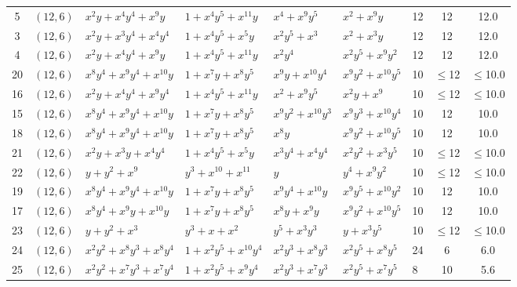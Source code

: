 \begin{table}[t]
\begin{tabular*}{\textwidth}{@{\extracolsep{\fill}}cllllllcc}
5 & $(12,6)$ & $x^{2}y{+}x^{4}y^{4}{+}x^{9}y$ & $1{+}x^{4}y^{5}{+}x^{11}y$ & $x^{4}{+}x^{9}y^{5}$ & $x^{2}{+}x^{9}y$ & 12 & 12 & 12.0 \\
3 & $(12,6)$ & $x^{2}y{+}x^{3}y^{4}{+}x^{4}y^{4}$ & $1{+}x^{4}y^{5}{+}x^{5}y$ & $x^{2}y^{5}{+}x^{3}$ & $x^{2}{+}x^{3}y$ & 12 & 12 & 12.0 \\
4 & $(12,6)$ & $x^{2}y{+}x^{4}y^{4}{+}x^{9}y$ & $1{+}x^{4}y^{5}{+}x^{11}y$ & $x^{2}y^{4}$ & $x^{2}y^{5}{+}x^{9}y^{2}$ & 12 & 12 & 12.0 \\
20 & $(12,6)$ & $x^{8}y^{4}{+}x^{9}y^{4}{+}x^{10}y$ & $1{+}x^{7}y{+}x^{8}y^{5}$ & $x^{9}y{+}x^{10}y^{4}$ & $x^{9}y^{2}{+}x^{10}y^{5}$ & 10 & $\leq$12 & $\leq$10.0 \\
16 & $(12,6)$ & $x^{2}y{+}x^{4}y^{4}{+}x^{9}y^{4}$ & $1{+}x^{4}y^{5}{+}x^{11}y$ & $x^{2}{+}x^{9}y^{5}$ & $x^{2}y{+}x^{9}$ & 10 & $\leq$12 & $\leq$10.0 \\
15 & $(12,6)$ & $x^{8}y^{4}{+}x^{9}y^{4}{+}x^{10}y$ & $1{+}x^{7}y{+}x^{8}y^{5}$ & $x^{9}y^{2}{+}x^{10}y^{3}$ & $x^{9}y^{3}{+}x^{10}y^{4}$ & 10 & 12 & 10.0 \\
18 & $(12,6)$ & $x^{8}y^{4}{+}x^{9}y^{4}{+}x^{10}y$ & $1{+}x^{7}y{+}x^{8}y^{5}$ & $x^{8}y$ & $x^{9}y^{2}{+}x^{10}y^{5}$ & 10 & 12 & 10.0 \\
21 & $(12,6)$ & $x^{2}y{+}x^{3}y{+}x^{4}y^{4}$ & $1{+}x^{4}y^{5}{+}x^{5}y$ & $x^{3}y^{4}{+}x^{4}y^{4}$ & $x^{2}y^{2}{+}x^{3}y^{5}$ & 10 & $\leq$12 & $\leq$10.0 \\
22 & $(12,6)$ & $y{+}y^{2}{+}x^{9}$ & $y^{3}{+}x^{10}{+}x^{11}$ & $y$ & $y^{4}{+}x^{9}y^{2}$ & 10 & $\leq$12 & $\leq$10.0 \\
19 & $(12,6)$ & $x^{8}y^{4}{+}x^{9}y^{4}{+}x^{10}y$ & $1{+}x^{7}y{+}x^{8}y^{5}$ & $x^{9}y^{4}{+}x^{10}y$ & $x^{9}y^{5}{+}x^{10}y^{2}$ & 10 & 12 & 10.0 \\
17 & $(12,6)$ & $x^{8}y^{4}{+}x^{9}y{+}x^{10}y$ & $1{+}x^{7}y{+}x^{8}y^{5}$ & $x^{8}y{+}x^{9}y$ & $x^{9}y^{2}{+}x^{10}y^{5}$ & 10 & 12 & 10.0 \\
23 & $(12,6)$ & $y{+}y^{2}{+}x^{3}$ & $y^{3}{+}x{+}x^{2}$ & $y^{5}{+}x^{3}y^{3}$ & $y{+}x^{3}y^{5}$ & 10 & $\leq$12 & $\leq$10.0 \\
24 & $(12,6)$ & $x^{2}y^{2}{+}x^{8}y^{3}{+}x^{8}y^{4}$ & $1{+}x^{2}y^{5}{+}x^{10}y^{4}$ & $x^{2}y^{3}{+}x^{8}y^{3}$ & $x^{2}y^{5}{+}x^{8}y^{5}$ & 24 & 6 & 6.0 \\
25 & $(12,6)$ & $x^{2}y^{2}{+}x^{7}y^{3}{+}x^{7}y^{4}$ & $1{+}x^{2}y^{5}{+}x^{9}y^{4}$ & $x^{2}y^{3}{+}x^{7}y^{3}$ & $x^{2}y^{5}{+}x^{7}y^{5}$ & 8 & 10 & 5.6 \\

\end{tabular*}
\end{table}
